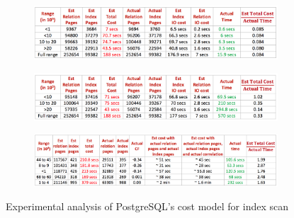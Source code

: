 \documentclass{article}
\begin{document}
\newpage
\begin{figure}
	\begin{subfigure}{\linewidth}
		\centering
		\includegraphics[scale=0.59]{./figs/6a.png}
		\label{fig:analysis_corr1}
	\end{subfigure}
	\medskip
	\begin{subfigure}{\linewidth}
		\centering
		\includegraphics[scale=0.59]{./figs/6b.png}
		\label{fig:analysis_corr_minus1}
	\end{subfigure}
\medskip
\begin{subfigure}{\linewidth}
	\centering
	\includegraphics[scale=0.57]{./figs/6c.png}
	\label{fig:analysis_corr0}
\end{subfigure}
	\caption{Experimental analysis of PostgreSQL's cost model for index scan}
	\label{table:pg_index}
\end{figure}
\end{document}

